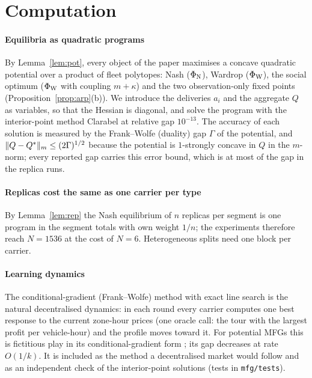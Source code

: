 \documentclass[preprint,11pt,authoryear]{elsarticle}
\theoremstyle{plain}
\theoremstyle{remark}
\begin{document}






\section{Computation}\label{sec:comp}

\paragraph{Equilibria as quadratic programs} By Lemma~\ref{lem:pot}, every object of the paper maximises a concave quadratic potential over a product of fleet polytopes: Nash ($\Phi_{\mathrm{N}}$), Wardrop ($\Phi_{\mathrm{W}}$), the social optimum ($\Phi_{\mathrm{W}}$ with coupling $m+\kappa$) and the two observation-only fixed points (Proposition~\ref{prop:arp}(b)). We introduce the deliveries $a_i$ and the aggregate $Q$ as variables, so that the Hessian is diagonal, and solve the program with the interior-point method Clarabel \citep{Clarabel2024} at relative gap $10^{-13}$. The accuracy of each solution is measured by the Frank--Wolfe (duality) gap $\Gamma$ of the potential, and $\lVert Q-Q^*\rVert_m\le(2\Gamma)^{1/2}$ because the potential is $1$-strongly concave in $Q$ in the $m$-norm; every reported gap carries this error bound, which is at most \ErrMax{} of the gap in the replica runs.

\paragraph{Replicas cost the same as one carrier per type} By Lemma~\ref{lem:rep} the Nash equilibrium of $n$ replicas per segment is one program in the segment totals with own weight $1/n$; the experiments therefore reach $N=1536$ at the cost of $N=6$. Heterogeneous splits need one block per carrier.

\paragraph{Learning dynamics} The conditional-gradient (Frank--Wolfe) method with exact line search is the natural decentralised dynamics: in each round every carrier computes one best response to the current zone-hour prices (one oracle call: the tour with the largest profit per vehicle-hour) and the profile moves toward it. For potential MFGs this is fictitious play in its conditional-gradient form \citep{CardaliaguetHadikhanloo2017,LavignePfeiffer2023}; its gap decreases at rate $O(1/k)$. It is included as the method a decentralised market would follow and as an independent check of the interior-point solutions (tests in \texttt{mfg/tests}).
\end{document}
